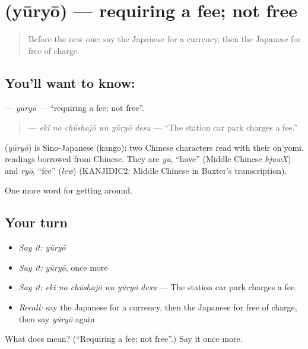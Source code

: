 \section[\texorpdfstring{\ja{ゆうりょう} (yūryō)}{ゆうりょう (yūryō)}]{ (yūryō) — requiring a fee; not free}

\label{lesson:JA-C388-yuuryou}



\begin{quote}
Before the new one: say the Japanese for a currency, then the Japanese for free of charge.
\end{quote}

\subsection*{You'll want to know: }
\textbf{} — \emph{yūryō} — \textquotedblleft{}requiring a fee; not free\textquotedblright{}.

\begin{quote}
\textbf{  } — \emph{eki no chūshajō wa yūryō desu} — \textquotedblleft{}The station car park charges a fee.\textquotedblright{}
\end{quote}

\begin{cousinweb}
\textbf{} (\emph{yūryō}) is Sino-Japanese (kango): two Chinese characters read with their on'yomi, readings borrowed from Chinese. They are \emph{yū}, \textquotedblleft{}have\textquotedblright{} (Middle Chinese \emph{hjuwX}) and \emph{ryō}, \textquotedblleft{}fee\textquotedblright{} (\emph{lew}) (KANJIDIC2; Middle Chinese in Baxter's transcription).
\end{cousinweb}

\begin{grammarlens}[title={What you've built}]
One more word for getting around.
\end{grammarlens}

\subsection*{Your turn}
\begin{itemize}
\raggedright
  \item \emph{Say it:} \emph{yūryō}
  \item \emph{Say it:} \emph{yūryō}, once more
  \item \emph{Say it:} \emph{eki no chūshajō wa yūryō desu} — The station car park charges a fee.
  \item \emph{Recall:} say the Japanese for a currency, then the Japanese for free of charge, then say \emph{yūryō} again
\end{itemize}

\begin{tcolorbox}[breakable,colback=teal!4,colframe=teal!35!black,title={Before you move on}]
What does  mean? (\textquotedblleft{}Requiring a fee; not free\textquotedblright{}.) Say it once more.
\end{tcolorbox}
